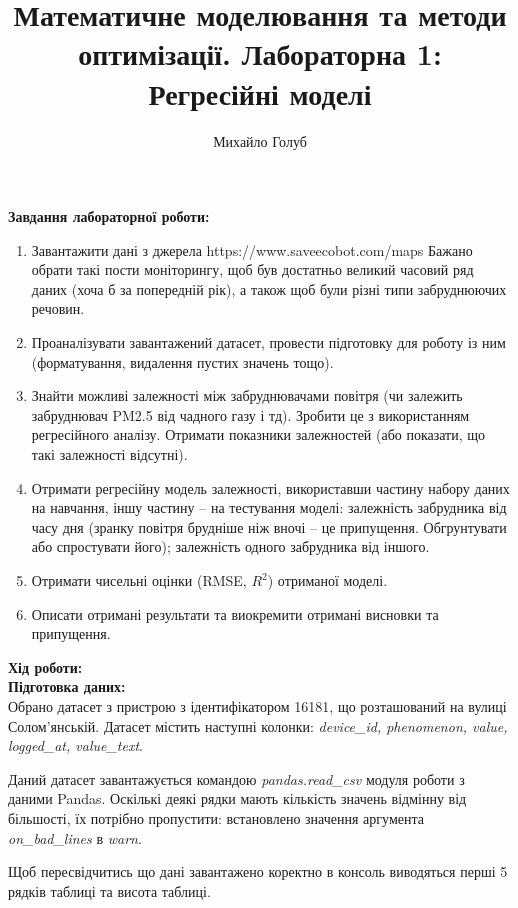 \documentclass{article}
\title{Математичне моделювання та методи оптимізації. Лабораторна 1: Регресійні моделі}
\author{Михайло Голуб}
\begin{document}
\maketitle
\newpage

\textbf{Завдання лабораторної роботи:}\\\indent
\begin{enumerate}
	\item Завантажити дані з джерела https://www.saveecobot.com/maps Бажано обрати такі пости моніторингу, щоб був достатньо великий часовий ряд даних (хоча б за попередній рік), а також щоб були різні типи забруднюючих речовин.
	\item Проаналізувати завантажений датасет, провести підготовку для роботу із ним (форматування, видалення пустих значень тощо).
	\item Знайти можливі залежності між забруднювачами повітря (чи залежить забруднювач PM2.5 від чадного газу і тд). Зробити це з використанням регресійного аналізу. Отримати показники залежностей (або показати, що такі залежності відсутні). 
	\item Отримати регресійну модель залежності, використавши частину набору даних на навчання, іншу частину – на тестування моделі: 	залежність забрудника від часу дня (зранку повітря брудніше ніж вночі – це припущення. Обгрунтувати або спростувати його); залежність одного забрудника від іншого.
	\item Отримати чисельні оцінки (RMSE, $R^2$) отриманої моделі.
	\item Описати отримані результати та виокремити отримані висновки та припущення.
\end{enumerate}
\newpage


\textbf{Хід роботи:}\\\indent
\textbf{Підготовка даних:}\\\indent
Обрано датасет з пристрою з ідентифікатором 16181, що розташований на вулиці Солом'янській. Датасет містить наступні колонки: \textit{device\_id, phenomenon, value, logged\_at, value\_text}.\indent

Даний датасет завантажується командою \textit{pandas.read\_csv} модуля роботи з даними Pandas. Оскількі деякі рядки мають кількість значень відмінну від більшості, їх потрібно пропустити: встановлено значення аргумента \textit{on\_bad\_lines} в \textit{warn}.\indent

Щоб пересвідчитись що дані завантажено коректно в консоль виводяться перші 5 рядків таблиці та висота таблиці.\indent
\end{document}
